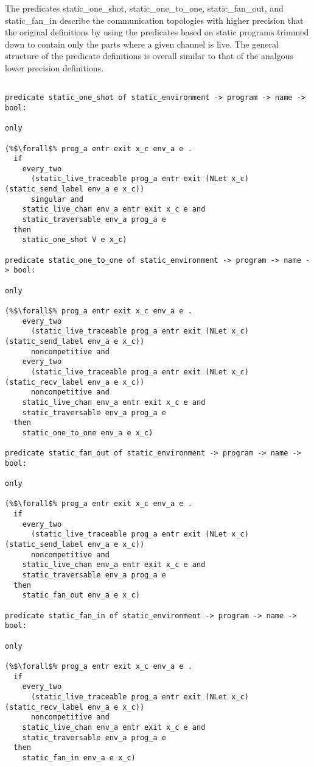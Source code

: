 \documentclass{article}
\begin{document}
The predicates static\_one\_shot, static\_one\_to\_one, static\_fan\_out, and static\_fan\_in describe
the communication topologies with higher precision that the original definitions by using the
predicates based on static programs trimmed down to contain only the parts where a given channel is
live. The general structure of the predicate definitions is overall similar to that of the
analgous lower precision definitions. 

\begin{lstlisting}[language=logic, style=codestyle1, escapechar=\%]

predicate static_one_shot of static_environment -> program -> name -> bool:

only

(%$\forall$% prog_a entr exit x_c env_a e . 
  if
    every_two
      (static_live_traceable prog_a entr exit (NLet x_c) (static_send_label env_a e x_c))
      singular and 
    static_live_chan env_a entr exit x_c e and 
    static_traversable env_a prog_a e
  then
    static_one_shot V e x_c)

predicate static_one_to_one of static_environment -> program -> name -> bool:

only

(%$\forall$% prog_a entr exit x_c env_a e .
    every_two
      (static_live_traceable prog_a entr exit (NLet x_c) (static_send_label env_a e x_c))
      noncompetitive and 
    every_two
      (static_live_traceable prog_a entr exit (NLet x_c) (static_recv_label env_a e x_c))
      noncompetitive and
    static_live_chan env_a entr exit x_c e and
    static_traversable env_a prog_a e
  then
    static_one_to_one env_a e x_c)

predicate static_fan_out of static_environment -> program -> name -> bool:

only

(%$\forall$% prog_a entr exit x_c env_a e .
  if
    every_two
      (static_live_traceable prog_a entr exit (NLet x_c) (static_send_label env_a e x_c))
      noncompetitive and
    static_live_chan env_a entr exit x_c e and
    static_traversable env_a prog_a e
  then
    static_fan_out env_a e x_c)

predicate static_fan_in of static_environment -> program -> name -> bool:

only

(%$\forall$% prog_a entr exit x_c env_a e .
  if
    every_two
      (static_live_traceable prog_a entr exit (NLet x_c) (static_recv_label env_a e x_c))
      noncompetitive and 
    static_live_chan env_a entr exit x_c e and
    static_traversable env_a prog_a e
  then
    static_fan_in env_a e x_c)


  \end{lstlisting}
\end{document}
